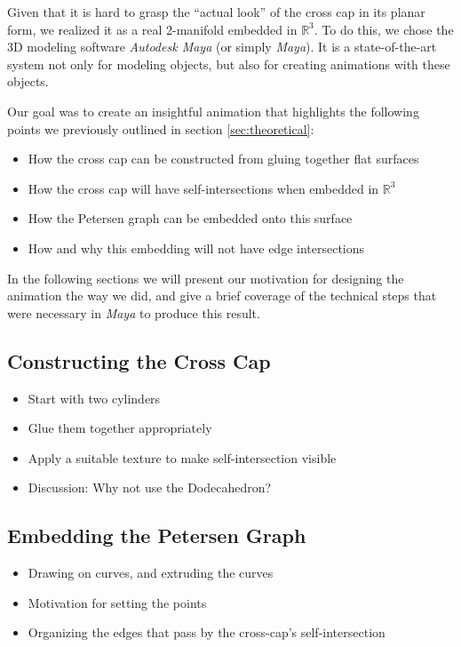 \documentclass[11pt,            %
               a4paper,         %
               oneside,         %
               DIV12,           %
               fleqn,           %
               halfparskip,     %
               nochapterprefix, %
              ]{scrartcl} %
\theoremstyle{definition}
\begin{document}
Given that it is hard to grasp the “actual look” of the cross cap
in its planar form, we realized it as a real 2-manifold embedded in
$\mathbb{R}^3$. To do this, we chose the 3D modeling software
\emph{Autodesk Maya} (or simply \emph{Maya}). It is a state-of-the-art
system not only for modeling objects, but also for creating animations
with these objects.

Our goal was to create an insightful animation that highlights the
following points we previously outlined in section
\ref{sec:theoretical}:

\begin{itemize}
  \item How the cross cap can be constructed from gluing together flat
    surfaces
  \item How the cross cap will have self-intersections when embedded
    in $\mathbb{R}^3$
  \item How the Petersen graph can be embedded onto this surface
  \item How and why this embedding will not have edge intersections
\end{itemize}

In the following sections we will present our motivation for designing
the animation the way we did, and give a brief coverage of the
technical steps that were necessary in \emph{Maya} to produce this
result.

\subsection{Constructing the Cross Cap}

\begin{itemize}
  \item Start with two cylinders
  \item Glue them together appropriately
  \item Apply a suitable texture to make self-intersection visible
  \item Discussion: Why not use the Dodecahedron?
\end{itemize}


\subsection{Embedding the Petersen Graph}

\begin{itemize}
  \item Drawing on curves, and extruding the curves
  \item Motivation for setting the points
  \item Organizing the edges that pass by the cross-cap’s self-intersection
\end{itemize}
\end{document}
